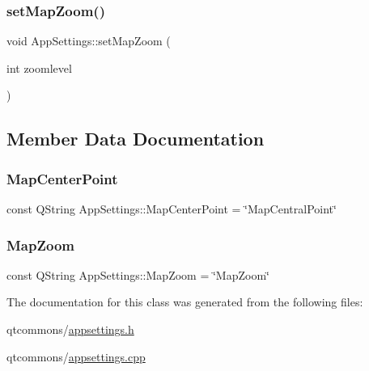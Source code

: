\mbox{\label{classdisplace_1_1_app_settings_a0928ad2294eac0f34ae5130b1e9c75e2}} 
\subsubsection{\texorpdfstring{setMapZoom()}{setMapZoom()}}
{\footnotesize\ttfamily void App\+Settings\+::set\+Map\+Zoom (\begin{DoxyParamCaption}\item[{int}]{zoomlevel }\end{DoxyParamCaption})}



\subsection{Member Data Documentation}
\mbox{\label{classdisplace_1_1_app_settings_a8d051344fd2190972d2cecfc82eb8460}} 
\subsubsection{\texorpdfstring{MapCenterPoint}{MapCenterPoint}}
{\footnotesize\ttfamily const Q\+String App\+Settings\+::\+Map\+Center\+Point = \char`\"{}Map\+Central\+Point\char`\"{}\hspace{0.3cm}{\ttfamily [static]}}

\mbox{\label{classdisplace_1_1_app_settings_a59de52c5f6612dbc450ccf65f2db88f8}} 
\subsubsection{\texorpdfstring{MapZoom}{MapZoom}}
{\footnotesize\ttfamily const Q\+String App\+Settings\+::\+Map\+Zoom = \char`\"{}Map\+Zoom\char`\"{}\hspace{0.3cm}{\ttfamily [static]}}



The documentation for this class was generated from the following files\+:\begin{DoxyCompactItemize}
\item 
qtcommons/\mbox{\hyperlink{appsettings_8h}{appsettings.\+h}}\item 
qtcommons/\mbox{\hyperlink{appsettings_8cpp}{appsettings.\+cpp}}\end{DoxyCompactItemize}
